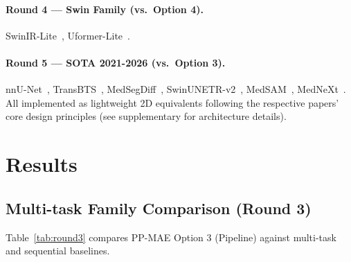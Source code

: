 \documentclass[runningheads]{llncs}
\begin{document}
\paragraph{Round 4 — Swin Family (vs.\ Option 4).}
SwinIR-Lite~\cite{swinir}, Uformer-Lite~\cite{uformer}.

\paragraph{Round 5 — SOTA 2021-2026 (vs.\ Option 3).}
nnU-Net~\cite{nnunet}, TransBTS~\cite{transbts},
MedSegDiff~\cite{medsegdiff}, SwinUNETR-v2~\cite{swinunetrv2},
MedSAM~\cite{medsam}, MedNeXt~\cite{mednext}.
All implemented as lightweight 2D equivalents following the respective
papers' core design principles (see supplementary for architecture details).


\section{Results}
\label{sec:results}

\subsection{Multi-task Family Comparison (Round 3)}

Table~\ref{tab:round3} compares PP-MAE Option 3 (Pipeline) against
multi-task and sequential baselines.
\end{document}

